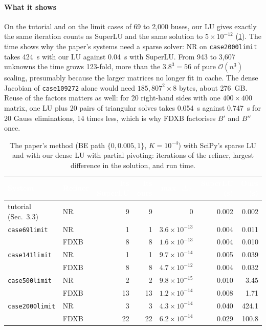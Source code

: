 \documentclass[11pt,a4paper]{article}
\newcommand{\thead}[1]{\textcolor{white}{\sffamily\bfseries\small #1}}
\newcommand{\headrow}{\rowcolor{navy}}
\newcommand{\code}[1]{\texttt{#1}}
\begin{document}
\paragraph{What it shows} On the tutorial and on the limit cases of 69 to 2{,}000 buses, our LU gives
exactly the same iteration counts as SuperLU and the same solution to $5\times10^{-12}$
(\cref{tab:ownlu}). The time shows why the paper's systems need a sparse solver: NR on
\code{case2000limit} takes \SI{424}{s} with our LU against \SI{0.04}{s} with SuperLU. From 943 to 3{,}607
unknowns the time grows 123-fold, more than the $3.8^3=56$ of pure $\mathcal{O}(n^3)$ scaling, presumably
because the larger matrices no longer fit in cache. The dense Jacobian of \code{case109272} alone would need
$185{,}807^2\times8$ bytes, about \SI{276}{GB}. Reuse of the factors matters as well: for 20 right-hand sides
with one $400\times400$ matrix, one LU plus 20 pairs of triangular solves takes \SI{0.054}{s} against
\SI{0.747}{s} for 20 Gauss eliminations, 14 times less, which is why FDXB factorises $B'$ and $B''$ once.

\begin{table}[!htbp]
\centering
\caption[The paper's method with our own LU]{The paper's method (BE path $\{0,0.005,1\}$, $K=10^{-4}$) with
SciPy's sparse LU and with our dense LU with partial pivoting: iterations of the refiner, largest difference
in the solution, and run time.}
\label{tab:ownlu}
\small
\begin{tabular}{@{}l l r r r r r@{}}
\toprule
\headrow \thead{System} & \thead{Refiner} & \thead{Its SuperLU} & \thead{Its ours} & \thead{max $|\Delta x|$} & \thead{SuperLU (s)} & \thead{Ours (s)} \\
\midrule
tutorial (Sec.~3.3)  & NR   & 9  & 9  & 0             & 0.002 & 0.002 \\
\code{case69limit}   & NR   & 1  & 1  & $3.6\times10^{-13}$ & 0.004 & 0.011 \\
                     & FDXB & 8  & 8  & $1.6\times10^{-13}$ & 0.004 & 0.010 \\
\code{case141limit}  & NR   & 1  & 1  & $9.7\times10^{-14}$ & 0.005 & 0.039 \\
                     & FDXB & 8  & 8  & $4.7\times10^{-12}$ & 0.004 & 0.032 \\
\code{case500limit}  & NR   & 2  & 2  & $9.8\times10^{-15}$ & 0.010 & 3.45 \\
                     & FDXB & 13 & 13 & $1.2\times10^{-14}$ & 0.008 & 1.71 \\
\code{case2000limit} & NR   & 3  & 3  & $4.3\times10^{-14}$ & 0.040 & 424.1 \\
                     & FDXB & 22 & 22 & $6.2\times10^{-14}$ & 0.029 & 100.8 \\
\bottomrule
\end{tabular}
\end{table}
\end{document}
